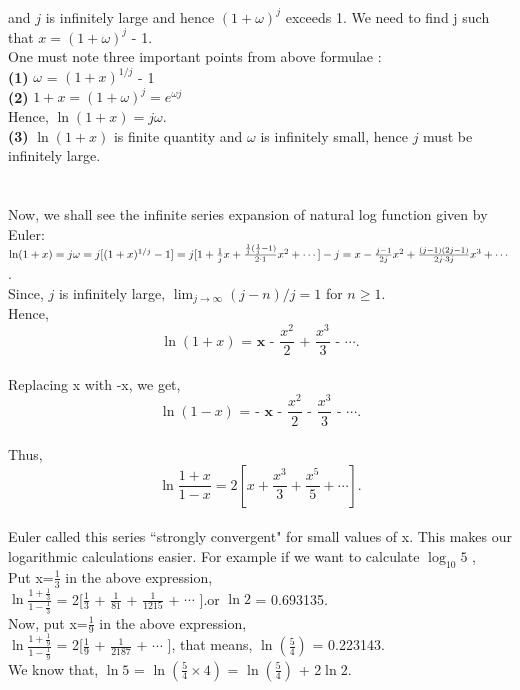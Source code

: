 \documentclass[a4paper,reqno,11pt]{book}
\theoremstyle{plain}%
\theoremstyle{definition}
\begin{document}
and $j$ is infinitely large and hence  $( 1 + \omega)^j$ exceeds 1.
We need to find j such that $x = ( 1 + \omega)^j$ - 1.\\
One must note three important points from above formulae :\\
\textbf{(1)} $\omega$ = $(1 + x)^{1/j}$ - 1 \\
\textbf{(2)}  $1 + x =  (1 + \omega)^j = e^{\omega j} $\\
Hence, $\ln(1 + x) = j\omega$.\\
\textbf{(3)}  $\ln(1 + x)$ is finite quantity and $\omega$ is infinitely small, hence $j$ must be 
infinitely large. \\
\\
\\
Now, we shall see the infinite series expansion of natural log function given by Euler:\\
$\ln(1 + x) = j\omega = j [(1 + x)^{1/j} - 1] = j[ 1 + \frac{1}{j}x + \frac{\frac{1}{j}(\frac{1}{j}-1)}{2\cdot1}x^2 + \cdots] - j\\
= x - \frac{j-1}{2j}x^2 + \frac{(j-1)(2j-1)}{2j\cdot3j}x^3 + \cdots$.\\
Since, $j$ is infinitely large, $ \lim_{j\to\infty}(j-n)/j = 1$ for $n\geq1.$\\ 
\noindent Hence,\\
$$\textbf{$\ln(1+x)$ =  x - $\frac{x^2}{2}$ + $\frac{x^3}{3}$ - $\cdots$.}$$\\
Replacing x with -x, we get,
$$\textbf{$\ln(1-x)$ = - x - $\frac{x^2}{2}$ - $\frac{x^3}{3}$ - $\cdots$.}$$\\
Thus,\\
$$ \ln\frac{1+x}{1-x} = 2[ x + \frac{x^3}{3} + \frac{x^5}{5} + \cdots].$$
\\
Euler called this series ``strongly convergent" for small values of x.
This makes our logarithmic calculations easier. For example if we want to calculate $\log_{10}5$ , \\
Put x=$\frac{1}{3}$ in the above expression,\\
$\ln\frac{1+\frac{1}{3}}{1-\frac{1}{3}}$ = 2[$\frac{1}{3}$ + $\frac{1}{81}$ + $\frac{1}{1215}$ + $\cdots$ ].or $\ln2$ = 0.693135.\\
Now, put  x=$\frac{1}{9}$ in the above expression,\\
$\ln\frac{1+\frac{1}{9}}{1-\frac{1}{9}}$ = 2[$\frac{1}{9}$ + $\frac{1}{2187}$ + $\cdots$ ], that means, $\ln(\frac{5}{4})$ = 0.223143.\\
We know that, $\ln5$ = $\ln(\frac{5}{4}\times4)$ = $\ln(\frac{5}{4})$ + 2$\ln2$.\\
\end{document}
